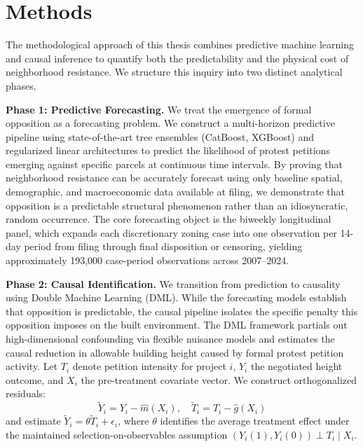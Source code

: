 \documentclass[twoside,11pt]{article}
\begin{document}


\section{Methods}
\label{sec:methodology}

The methodological approach of this thesis combines predictive machine learning and causal inference to quantify both the predictability and the physical cost of neighborhood resistance. We structure this inquiry into two distinct analytical phases.

\textbf{Phase 1: Predictive Forecasting.} We treat the emergence of formal opposition as a forecasting problem. We construct a multi-horizon predictive pipeline using state-of-the-art tree ensembles (CatBoost, XGBoost) and regularized linear architectures to predict the likelihood of protest petitions emerging against specific parcels at continuous time intervals. By proving that neighborhood resistance can be accurately forecast using only baseline spatial, demographic, and macroeconomic data available at filing, we demonstrate that opposition is a predictable structural phenomenon rather than an idiosyncratic, random occurrence. The core forecasting object is the biweekly longitudinal panel, which expands each discretionary zoning case into one observation per 14-day period from filing through final disposition or censoring, yielding approximately 193,000 case-period observations across 2007--2024.

\textbf{Phase 2: Causal Identification.} We transition from prediction to causality using Double Machine Learning (DML). While the forecasting models establish that opposition is predictable, the causal pipeline isolates the specific penalty this opposition imposes on the built environment. The DML framework partials out high-dimensional confounding via flexible nuisance models and estimates the causal reduction in allowable building height caused by formal protest petition activity. Let $T_i$ denote petition intensity for project $i$, $Y_i$ the negotiated height outcome, and $X_i$ the pre-treatment covariate vector. We construct orthogonalized residuals:
\begin{equation}
\tilde{Y}_i = Y_i - \hat{m}(X_i), \quad \tilde{T}_i = T_i - \hat{g}(X_i)
\end{equation}
and estimate $\tilde{Y}_i = \theta \tilde{T}_i + \epsilon_i$, where $\theta$ identifies the average treatment effect under the maintained selection-on-observables assumption $(Y_i(1), Y_i(0)) \perp T_i \mid X_i$.
\end{document}
